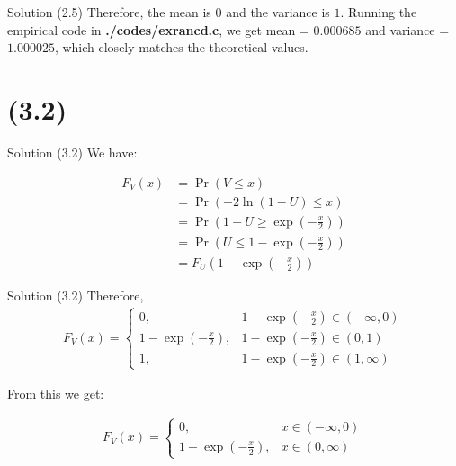 \documentclass{beamer}
\providecommand{\pr}[1]{\ensuremath{\Pr\left(#1\right)}}
\begin{document}
\begin{frame}{Solution (2.5)}
   Therefore, the mean is $0$ and the variance is $1$. Running the empirical code in \textbf{./codes/exrancd.c}, 
   we get mean = $0.000685$ and variance = $1.000025$, which closely matches the theoretical values.

\end{frame}

\section{(3.2)}
\begin{frame}{Solution (3.2)}
    We have:
    
    \begin{align}
    F_V(x) &= \pr{V \leq x} \\
    &= \pr{-2\ln(1-U) \leq x} \\
    &= \pr{1-U \geq	\exp{\left(-\frac{x}{2}\right)}} \\
    &= \pr{U \leq 1 - \exp{\left(-\frac{x}{2}\right)}} \\
    &= F_U\left(1 - \exp{\left(-\frac{x}{2}\right)}\right) 
    \end{align}
    
    \end{frame}

\begin{frame}{Solution (3.2)}
    Therefore,
    \begin{align}
       F_V(x) =
        \begin{cases}
            0, & 1 - \exp{\left(-\frac{x}{2}\right)} \in (-\infty,0) \\
            1 - \exp{\left(-\frac{x}{2}\right)}, & 1 - \exp{\left(-\frac{x}{2}\right)} \in (0,1) \\
            1, & 1 - \exp{\left(-\frac{x}{2}\right)} \in (1, \infty)
        \end{cases}
    \end{align}
    
    From this we get:
    
    \begin{align}
       F_V(x) =
        \begin{cases}
            0, & x \in (-\infty,0) \\
            1 - \exp{\left(-\frac{x}{2}\right)}, & x \in (0,\infty) 
        \end{cases}
    \end{align}
\end{frame}
\end{document}

